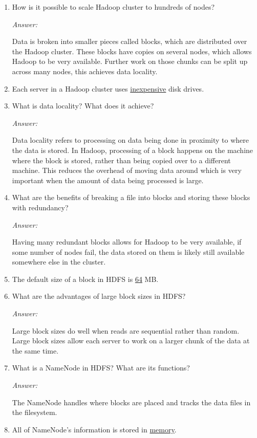\documentclass[11pt]{article}
\newcommand{\blank}[1]{\underline{#1}}
\newcommand{\answer}{\vspace{0.25em}\par\textit{Answer:}\vspace{0.25em}\par}
\begin{document}
\begin{enumerate}
  \item How is it possible to scale Hadoop cluster to hundreds of nodes?
    \answer Data is broken into smaller pieces called blocks, which
    are distributed over the Hadoop cluster. These blocks have copies
    on several nodes, which allows Hadoop to be very available. Further
    work on those chunks can be split up across many nodes, this
    achieves data locality.
  \item Each server in a Hadoop cluster uses \blank{inexpensive} disk drives.
  \item What is data locality? What does it achieve?
    \answer Data locality refers to processing on data being done in
    proximity to where the data is stored. In Hadoop, processing of a
    block happens on the machine where the block is stored, rather
    than being copied over to a different machine. This reduces the
    overhead of moving data around which is very important when the
    amount of data being processed is large.
  \item What are the benefits of breaking a file into blocks and
    storing these blocks with
    redundancy?
    \answer Having many redundant blocks allows for Hadoop to be very
    available, if some number of nodes fail, the data stored on them
    is likely still available somewhere else in the cluster.
  \item The default size of a block in HDFS is \blank{64} MB.
  \item What are the advantages of large block sizes in HDFS?
    \answer Large block sizes do well when reads are sequential
    rather than random. Large block sizes allow each server to work
    on a larger chunk of the data at the same time.
  \item What is a NameNode in HDFS? What are its functions?
    \answer The NameNode handles where blocks are placed and tracks
    the data files in the filesystem.
  \item All of NameNode's information is stored in \blank{memory}.
\end{enumerate}
\end{document}

